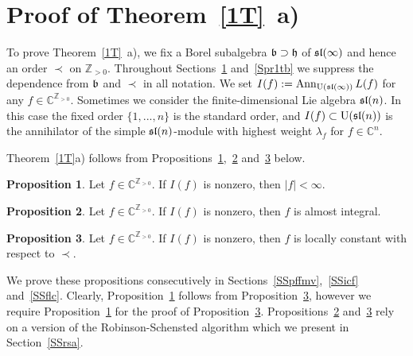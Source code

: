\documentclass[10pt]{amsart}\oddsidemargin -1mm \evensidemargin -1mm \topmargin -15mm\headheight5mm \headsep 3.5mm \textheight 245mm\textwidth 170mm %
\theoremstyle{definition}\newtheorem{theorem}{Theorem}[section]\newtheorem{lemma}[theorem]{Lemma}\newtheorem{remark}[theorem]{Remark}\newtheorem{proposition}[theorem]{Proposition}\newtheorem{corollary}[theorem]{Corollary}\newtheorem{definition}[theorem]{Definition}\newtheorem{Ex}[theorem]{Example}
\begin{document}
\section{Proof of Theorem~\ref{1T}~a)}\label{Spr1ta}
To prove Theorem~\ref{1T}~a), we fix a Borel subalgebra $\frak b\supset\frak h$ of $\frak{sl}(\infty)$ and hence an order $\prec$ on $\mathbb Z_{>0}$. Throughout Sections~\ref{Spr1ta} and~\ref{Spr1tb} we suppress the dependence from $\frak b$ and $\prec$ in all notation. We set $I(f):=\operatorname{\mathrm{Ann}}_{\operatorname{\mathrm{U}}(\frak{sl}(\infty))} L(f)$ for any $f\in\mathbb C^{\mathbb Z_{>0}}$. Sometimes we consider the finite-dimensional Lie algebra $\frak{sl}(n)$. In this case the fixed order $\{1,..., n\}$ is the standard order, and $I(f)\subset\operatorname{\mathrm{U}}(\frak{sl}(n))$ is the annihilator of the simple $\frak{sl}(n)$-module with highest weight $\lambda_f$ for $f\in\mathbb C^n$.

Theorem~\ref{1T}a) follows from Propositions~\ref{Lftfmv},~\ref{Lfdcf} and~\ref{Lflc} below.
\begin{proposition}\label{Lftfmv}Let $f\in\mathbb C^{\mathbb Z_{>0}}$. If $I(f)$ is nonzero, then $|f|<\infty$.\end{proposition}
\begin{proposition}\label{Lfdcf}Let $f\in\mathbb C^{\mathbb Z_{>0}}$. If $I(f)$ is nonzero, then $f$ is almost integral.\end{proposition}
\begin{proposition}\label{Lflc}Let $f\in\mathbb C^{\mathbb Z_{>0}}$. If $I(f)$ is nonzero, then $f$ is locally constant with respect to $\prec$.\end{proposition}
We prove these propositions consecutively in Sections~\ref{SSpffmv},~\ref{SSicf} and~\ref{SSflc}. Clearly, Proposition~\ref{Lftfmv} follows from Proposition~\ref{Lflc}, however we require Proposition~\ref{Lftfmv} for the proof of Proposition~\ref{Lflc}. Propositions~\ref{Lfdcf} and~\ref{Lflc} rely on a version of the Robinson-Schensted algorithm which we present in Section~\ref{SSrsa}.%
\end{document}
